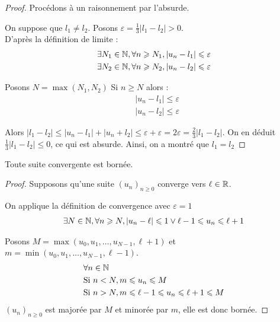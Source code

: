 \begin{proof}
         \par Procédons à un raisonnement par l'absurde. \\
         \par \noindent On suppose que $l_1 \neq l_2$. Posons $\varepsilon = \frac{1}{3} |l_1 - l_2| > 0$. \\
         D'après la définition de limite :
         \begin{align*}
             &\exists N_1 \in \mathbb{N}, \forall n \geqslant N_1, |u_n - l_1| \leqslant \varepsilon \\
             &\exists N_2 \in \mathbb{N}, \forall n \geqslant N_2, |u_n - l_2| \leqslant \varepsilon
         \end{align*}
         \par \noindent Posons $N = \max(N_1, N_2)$ Si $n \geq N$ alors :
         \begin{align*}
             &|u_n - l_1| \leq \varepsilon \\
             &|u_n - l_2| \leq \varepsilon
         \end{align*}
         \par \noindent Alors $|l_1 - l_2| \leq |u_n - l_1| + |u_n + l_2| \leq \varepsilon + \varepsilon = 2\varepsilon = \frac{2}{3}|l_1 - l_2|$.
    On en déduit $\frac{1}{3}|l_1 - l_2| \leq 0$, ce qui est absurde. Ainsi, on a montré que $l_1 = l_2$
\end{proof}

\begin{graybox}
    \begin{theoreme}[]
    Toute suite convergente est bornée.
\end{theoreme}
\end{graybox}

\begin{proof}
        \par \noindent Supposons qu'une suite $(u_n)_{n \geq 0}$ converge vers $\ell \in \mathbb{R}$. 
        \par \noindent On applique la définition de convergence avec $\varepsilon = 1$
        \begin{align*}
            \exists N \in \mathbb{N}, \forall n \geqslant N, |u_n - \ell| \leqslant 1 \vee \ell - 1 \leqslant u_n \leqslant \ell + 1
        \end{align*}
        \par \noindent Posons $M = \max(u_0, u_1, \ldots, u_{N - 1}, \ell + 1)$ et $m = \min(u_0, u_1, \ldots, u_{N -1}, \ell - 1)$.
        \begin{align*}
            &\forall n \in \mathbb{N} \\
            &\textnormal{Si } n < N, m \leqslant u_n \leqslant M \\
            &\textnormal{Si } n > N, m \leqslant \ell - 1 \leqslant u_n \leqslant \ell + 1 \leqslant M
        \end{align*}
        $(u_n)_{n \geq 0}$ est majorée par $M$ et minorée par $m$, elle est donc bornée.
    \end{proof}

